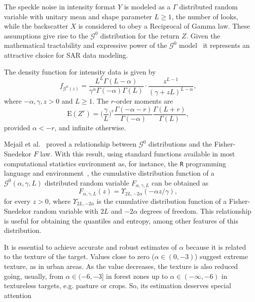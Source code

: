 \documentclass[twocolumn]{svjour3}
\begin{document}
The speckle noise in intensity format $Y$ is modeled as a $\Gamma$ distributed random variable with unitary mean and shape parameter $L\geq1$, the number of looks, while the backscatter $X$ is considered to obey a Reciprocal of Gamma law. 
These assumptions give rise to the $\mathcal{G}^{0}$ distribution for the return $Z$.
Given the mathematical tractability and expressive power of the $\mathcal{G}^{0}$ model~\cite{MejailJacoboFreryBustos:IJRS,mejailfreryjacobobustos2001} it represents an attractive choice for SAR data modeling.

The density function for intensity data is given by
\begin{equation}
f_{\mathcal{G}^{0}(z)} =\frac{L^{L}\Gamma ( L-\alpha
	) }{\gamma ^{\alpha }\Gamma ( -\alpha ) \Gamma (
	L) }\cdot  
\frac{z^{L-1}}{( \gamma +zL) ^{L-\alpha }},%
\label{ec_dens_gI0}
\end{equation}
where $-\alpha,\gamma ,z>0$ and $L\geq 1$. 
The $r$-order moments are
\begin{equation}
\text{E}(Z^r) =\Big(\frac{\gamma}{L}\Big)^r\frac{\Gamma ( -\alpha-r )}{ \Gamma (-\alpha) }
\frac{\Gamma (L+r )}{\Gamma (L)},
\label{moments_gI0}
\end{equation}
provided $\alpha<-r$, and infinite otherwise.

Mejail et al.~\cite{MejailJacoboFreryBustos:IJRS} proved a relationship between $\mathcal G^0$ distributions and the Fisher-Snedekor $F$ law.
With this result, using standard functions available in most computational statistics environment as, for instance, the \texttt R programming language and environment~\cite{RLanguage}, the cumulative distribution function of a $\mathcal G^0(\alpha,\gamma,L)$ distributed random variable $F_{\alpha,\gamma,L}$ can be obtained as
\begin{equation}
F_{\alpha,\gamma,L}(z) = \Upsilon_{2L, -2\alpha}(-\alpha  z / \gamma),
\label{eq:CDFG0}
\end{equation}
for every $z>0$, where $\Upsilon_{2L, -2\alpha}$ is the cumulative distribution function of a Fisher-Snedekor random variable with $2L$ and $-2\alpha$ degrees of freedom.
This relationship is useful for obtaining the quantiles and entropy, among other features of this distribution.

It is essential to achieve accurate and robust estimates of $\alpha$ because it is related to the texture of the target. 
Values close to zero ($\alpha \in (0,-3)$) suggest extreme texture, as in urban areas. 
As the value decreases, the texture is also reduced going, usually, from $\alpha \in (-6,-3]$ in forest zones up to $\alpha\in(-\infty,-6)$ in textureless targets, e.g. pasture or crops. So, its estimation deserves special attention
\end{document}
